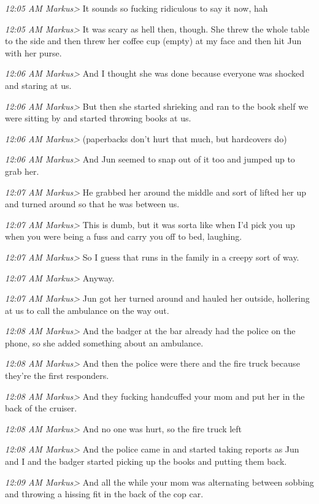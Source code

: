 {\emph{12:05 AM Markus\textgreater{}} It sounds so fucking ridiculous to
say it now, hah

\emph{12:05 AM Markus\textgreater{}} It was scary as hell then, though.
She threw the whole table to the side and then threw her coffee cup
(empty) at my face and then hit Jun with her purse.

\emph{12:06 AM Markus\textgreater{}} And I thought she was done because
everyone was shocked and staring at us.

\emph{12:06 AM Markus\textgreater{}} But then she started shrieking and
ran to the book shelf we were sitting by and started throwing books at
us.

\emph{12:06 AM Markus\textgreater{}} (paperbacks don't hurt that much,
but hardcovers do)

\emph{12:06 AM Markus\textgreater{}} And Jun seemed to snap out of it
too and jumped up to grab her.

\emph{12:07 AM Markus\textgreater{}} He grabbed her around the middle
and sort of lifted her up and turned around so that he was between us.

\emph{12:07 AM Markus\textgreater{}} This is dumb, but it was sorta like
when I'd pick you up when you were being a fuss and carry you off to
bed, laughing.

\emph{12:07 AM Markus\textgreater{}} So I guess that runs in the family
in a creepy sort of way.

\emph{12:07 AM Markus\textgreater{}} Anyway.

\emph{12:07 AM Markus\textgreater{}} Jun got her turned around and
hauled her outside, hollering at us to call the ambulance on the way
out.

\emph{12:08 AM Markus\textgreater{}} And the badger at the bar already
had the police on the phone, so she added something about an ambulance.

\emph{12:08 AM Markus\textgreater{}} And then the police were there and
the fire truck because they're the first responders.

\emph{12:08 AM Markus\textgreater{}} And they fucking handcuffed your
mom and put her in the back of the cruiser.

\emph{12:08 AM Markus\textgreater{}} And no one was hurt, so the fire
truck left

\emph{12:08 AM Markus\textgreater{}} And the police came in and started
taking reports as Jun and I and the badger started picking up the books
and putting them back.

\emph{12:09 AM Markus\textgreater{}} And all the while your mom was
alternating between sobbing and throwing a hissing fit in the back of
the cop car.

}
